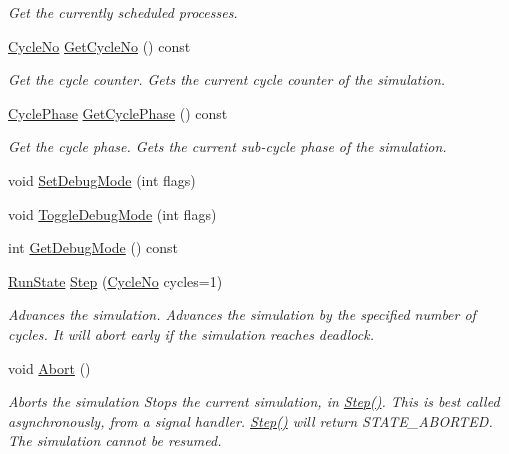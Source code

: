 \begin{DoxyCompactItemize}
\begin{DoxyCompactList}\small\item\em Get the currently scheduled processes. \end{DoxyCompactList}\item 
\hyperlink{namespace_simulator_a928f1e2101eba21bb0fe409e8c9ce573}{Cycle\+No} \hyperlink{class_simulator_1_1_kernel_a59b95ba6ae8f3abd6a2468fa6b66899d}{Get\+Cycle\+No} () const 
\begin{DoxyCompactList}\small\item\em Get the cycle counter. Gets the current cycle counter of the simulation. \end{DoxyCompactList}\item 
\hyperlink{namespace_simulator_afd4b64cfd93793eb135bdb1a3c58c238}{Cycle\+Phase} \hyperlink{class_simulator_1_1_kernel_ab76ee5f46fb946e067aa1fba595d2a7a}{Get\+Cycle\+Phase} () const 
\begin{DoxyCompactList}\small\item\em Get the cycle phase. Gets the current sub-\/cycle phase of the simulation. \end{DoxyCompactList}\item 
void \hyperlink{class_simulator_1_1_kernel_a96e873d4aafff467b1da6ba5c537d788}{Set\+Debug\+Mode} (int flags)
\item 
void \hyperlink{class_simulator_1_1_kernel_a4b381af089ab5befbacffabbebbc90d4}{Toggle\+Debug\+Mode} (int flags)
\item 
int \hyperlink{class_simulator_1_1_kernel_a842c78239f6feb1e7e41bfbc7822ef6d}{Get\+Debug\+Mode} () const 
\item 
\hyperlink{namespace_simulator_a7b6594cd8ea507163ee6e4d4db4ddad5}{Run\+State} \hyperlink{class_simulator_1_1_kernel_acacace30804ec07b738e7a24e7a09327}{Step} (\hyperlink{namespace_simulator_a928f1e2101eba21bb0fe409e8c9ce573}{Cycle\+No} cycles=1)
\begin{DoxyCompactList}\small\item\em Advances the simulation. Advances the simulation by the specified number of cycles. It will abort early if the simulation reaches deadlock. \end{DoxyCompactList}\item 
void \hyperlink{class_simulator_1_1_kernel_aae2cbea41e33acb29694d4cc1df33d97}{Abort} ()
\begin{DoxyCompactList}\small\item\em Aborts the simulation Stops the current simulation, in \hyperlink{class_simulator_1_1_kernel_acacace30804ec07b738e7a24e7a09327}{Step()}. This is best called asynchronously, from a signal handler. \hyperlink{class_simulator_1_1_kernel_acacace30804ec07b738e7a24e7a09327}{Step()} will return S\+T\+A\+T\+E\+\_\+\+A\+B\+O\+R\+T\+E\+D. The simulation cannot be resumed. \end{DoxyCompactList}\item 

\end{DoxyCompactItemize}
